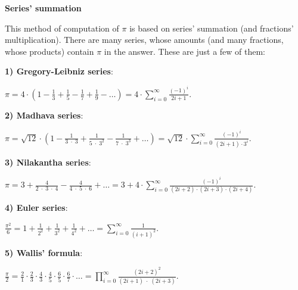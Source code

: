\documentclass[12pt]{article}
\begin{document}
\begin{titlepage}
\begin{center}
	\LARGE\textbf{Series' summation}
\end{center}
\large
This method of computation of $\pi$ is based on series' summation (and fractions' multiplication). There are many series, whose amounts (and many fractions, whose products) contain $\pi$ in the answer. These are just a few of them:

\begin{flushleft}
	
\textbf{1) Gregory-Leibniz series}:

$\pi=4\cdot\left(1-\frac{1}{3}+\frac{1}{5}-\frac{1}{7}+\frac{1}{9}-\ldots\right)=4\cdot\displaystyle\sum_{i=0}^{\infty} \frac{{\left(-1\right)}^{i}}{2i+1}$.

\textbf{2) Madhava series}:

$\pi=\sqrt{12}\cdot\left(1-\frac{1}{3\;\cdot\;3}+\frac{1}{5\;\cdot\;{3}^{2}}-\frac{1}{7\;\cdot\;{3}^{3}}+\ldots\right)=\sqrt{12}\cdot\displaystyle\sum_{i=0}^{\infty}\frac{{(-1)}^{i}}{\left(2i+1\right)\cdot{3}^{i}}$.

\textbf{3) Nilakantha series}:

$\pi=3\!+\!\frac{4}{2\;\cdot\;3\;\cdot\;4}\!-\!\frac{4}{4\;\cdot\;5\;\cdot\;6}\!+\!\ldots=3\!+\!4\!\cdot
\!\displaystyle\sum_{i=0}^{\infty}\frac{{\left(-1\right)^{i}}}{\left(2i+2\right)\cdot\left(2i+3\right)\cdot\left(2i+4\right)}$.

\textbf{4) Euler series}:

$\frac{{\pi}^{2}}{6}=1+\frac{1}{{2}^{2}}+\frac{1}{{3}^{2}}+\frac{1}{{4}^{2}}+\ldots=\displaystyle\sum_{i=0}^{\infty}\frac{1}{{\left(i+1\right)}^{2}}$.

\textbf{5) Wallis' formula}:

$\frac{\pi}{2}=\frac{2}{1}\cdot\frac{2}{3}\cdot\frac{4}{3}\cdot\frac{4}{5}\cdot\frac{6}{5}\cdot\frac{6}{7}\cdot\ldots=\prod\limits_{i=0}^{\infty}\frac{{\left(2i+2\right)}^{2}}{\left(2i+1\right)\;\cdot\;\left(2i+3\right)}$.

\end{flushleft}
\end{titlepage}
\end{document}
